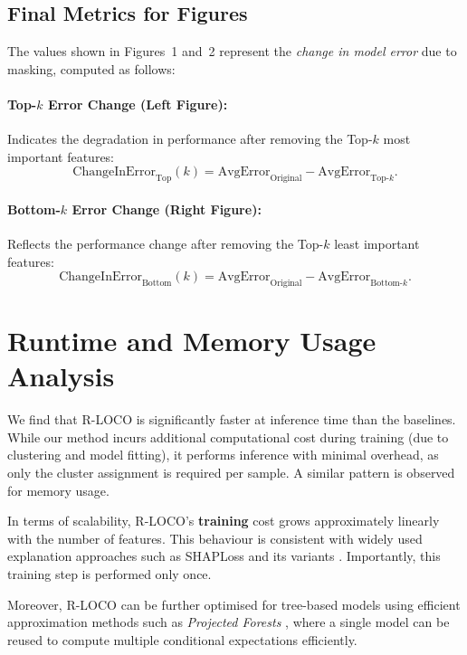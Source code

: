 \documentclass{article}
\theoremstyle{plain}
\theoremstyle{definition}
\theoremstyle{remark}
\begin{document}
\subsection{Final Metrics for Figures}
The values shown in Figures~1 and~2 represent the \emph{change in model error} due to masking, computed as follows:

\paragraph{Top-$k$ Error Change (Left Figure):}
Indicates the degradation in performance after removing the Top-$k$ most important features:
\[
\text{ChangeInError}_{\text{Top}}(k)
= \text{AvgError}_{\text{Original}} - \text{AvgError}_{\text{Top-}k}.
\]

\paragraph{Bottom-$k$ Error Change (Right Figure):}
Reflects the performance change after removing the Top-$k$ least important features:
\[
\text{ChangeInError}_{\text{Bottom}}(k)
= \text{AvgError}_{\text{Original}} - \text{AvgError}_{\text{Bottom-}k}.
\]


\section{Runtime and Memory Usage Analysis}
\label{sec:runtime-memory}

We find that R-LOCO is significantly faster at inference time than the baselines. While our method incurs additional computational cost during training (due to clustering and model fitting), it performs inference with minimal overhead, as only the cluster assignment is required per sample. A similar pattern is observed for memory usage.

In terms of scalability, R-LOCO’s \textbf{training} cost grows approximately linearly with the number of features. This behaviour is consistent with widely used explanation approaches such as SHAPLoss and its variants \citep{covert2020explaining}. Importantly, this training step is performed only once.

Moreover, R-LOCO can be further optimised for tree-based models using efficient approximation methods such as \textit{Projected Forests} \citep{benard2021shaff, amoukou2021consistent}, where a single model can be reused to compute multiple conditional expectations efficiently.
\end{document}
